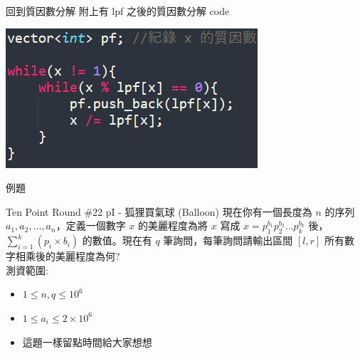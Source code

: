 \documentclass[aspectratio=169]{beamer}
\begin{document}
\begin{frame}{回到質因數分解}
    附上有 lpf 之後的質因數分解 code
    \begin{center}
        \includegraphics[]{images/code11.png}
    \end{center}
\end{frame}

\begin{frame}{例題}
    \begin{block}{Ten Point Round \#22 pI - 狐狸買氣球 (Balloon)}
        現在你有一個長度為 $n$ 的序列 $a_1, a_2, \dots, a_n$，定義一個數字 $x$ 的美麗程度為將 $x$ 寫成 $x = p_1^{b_1} p_2^{b_2} \ldots p_k^{b_k}$ 後，$\sum\limits_{i=1}^k (p_i \times b_i)$ 的數值。現在有 $q$ 筆詢問，每筆詢問請輸出區間 $[l,r]$ 所有數字相乘後的美麗程度為何? \\
        \vspace{5mm}
        測資範圍: 
        \begin{itemize}
            \item $1 \le n,q \le 10^6$
            \item $1 \le a_i \le 2 \times 10^6$
        \end{itemize}
    \end{block}
    \begin{itemize}
        \item<1-> 這題一樣留點時間給大家想想
    \end{itemize}
\end{frame}
\end{document}
